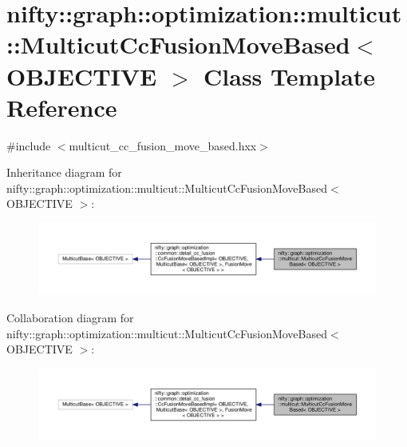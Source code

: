 \hypertarget{classnifty_1_1graph_1_1optimization_1_1multicut_1_1MulticutCcFusionMoveBased}{}\section{nifty\+:\+:graph\+:\+:optimization\+:\+:multicut\+:\+:Multicut\+Cc\+Fusion\+Move\+Based$<$ O\+B\+J\+E\+C\+T\+I\+V\+E $>$ Class Template Reference}
\label{classnifty_1_1graph_1_1optimization_1_1multicut_1_1MulticutCcFusionMoveBased}


{\ttfamily \#include $<$multicut\+\_\+cc\+\_\+fusion\+\_\+move\+\_\+based.\+hxx$>$}



Inheritance diagram for nifty\+:\+:graph\+:\+:optimization\+:\+:multicut\+:\+:Multicut\+Cc\+Fusion\+Move\+Based$<$ O\+B\+J\+E\+C\+T\+I\+V\+E $>$\+:\nopagebreak
\begin{figure}[H]
\begin{center}
\leavevmode
\includegraphics[width=350pt]{classnifty_1_1graph_1_1optimization_1_1multicut_1_1MulticutCcFusionMoveBased__inherit__graph}
\end{center}
\end{figure}


Collaboration diagram for nifty\+:\+:graph\+:\+:optimization\+:\+:multicut\+:\+:Multicut\+Cc\+Fusion\+Move\+Based$<$ O\+B\+J\+E\+C\+T\+I\+V\+E $>$\+:\nopagebreak
\begin{figure}[H]
\begin{center}
\leavevmode
\includegraphics[width=350pt]{classnifty_1_1graph_1_1optimization_1_1multicut_1_1MulticutCcFusionMoveBased__coll__graph}
\end{center}
\end{figure}
